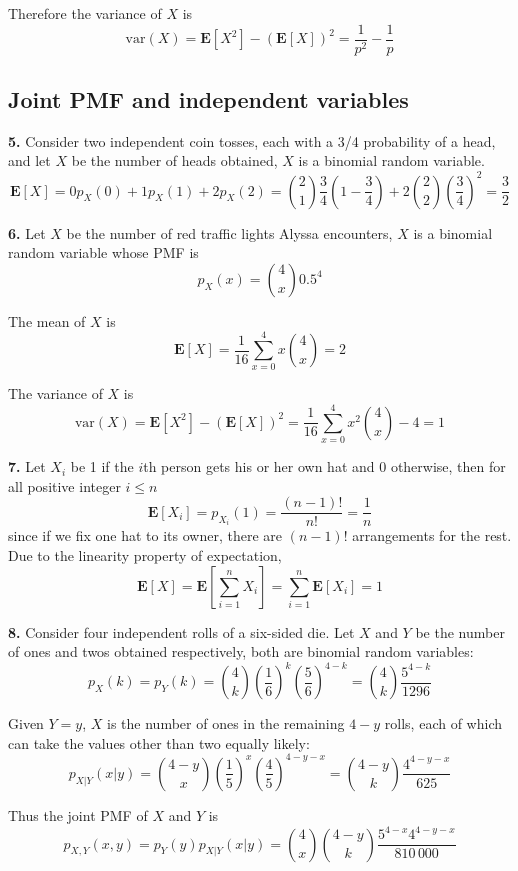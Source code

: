 \documentclass[a4paper,12pt]{article}
\newcommand{\E}{\mathbf E}
\newcommand{\var}{\mathrm{var}}
\newcommand{\exercise}[1]{\noindent\textbf{#1.}}
\begin{document}
Therefore the variance of $X$ is
\[\var(X) = \E\left[X^2\right] - (\E[X])^2 = \frac{1}{p^2} - \frac{1}{p}\]

\subsection{Joint PMF and independent variables}
\exercise 5  Consider two independent coin tosses,
each with a 3/4 probability of a head,
and let $X$ be the number of heads obtained,
$X$ is a binomial random variable.
\[\E[X] = 0p_X(0) + 1p_X(1) + 2p_X(2)
= \binom{2}{1}\frac{3}{4}\left(1 - \frac{3}{4}\right)
+ 2\binom{2}{2}\left(\frac{3}{4}\right)^2
= \frac{3}{2}\]

\exercise 6  Let $X$ be the number of red traffic lights Alyssa encounters,
$X$ is a binomial random variable whose PMF is
\[p_X(x) = \binom{4}{x}0.5^4\]

The mean of $X$ is
\[\E[X] = \frac{1}{16}\sum_{x=0}^4 x\binom{4}{x} = 2\]

The variance of $X$ is
\[\var(X) = \E\left[X^2\right] - (\E[X])^2
= \frac{1}{16}\sum_{x=0}^4 x^2\binom{4}{x} - 4 = 1\]

\exercise 7  Let $X_i$ be 1 if the $i$th person gets his or her own hat and 0
otherwise, then for all positive integer $i \le n$
\[\E[X_i] = p_{X_i}(1) = \frac{(n - 1)!}{n!} = \frac{1}{n}\]
since if we fix one hat to its owner, there are $(n - 1)!$ arrangements
for the rest.  Due to the linearity property of expectation,
\[\E[X] = \E\left[\sum_{i=1}^n X_i\right] = \sum_{i=1}^n\E[X_i] = 1\]

\exercise 8  Consider four independent rolls of a six-sided die.
Let $X$ and $Y$ be the number of ones and twos obtained respectively,
both are binomial random variables:
\[p_X(k) = p_Y(k)
= \binom{4}{k}\left(\frac{1}{6}\right)^k\left(\frac{5}{6}\right)^{4 - k}
= \binom{4}{k}\frac{5^{4 - k}}{1296}\]

Given $Y = y$, $X$ is the number of ones in the remaining $4 - y$ rolls,
each of which can take the values other than two equally likely:
\[p_{X|Y}(x|y)
= \binom{4 - y}{x}\left(\frac{1}{5}\right)^x\left(\frac{4}{5}\right)^{4 - y - x}
= \binom{4 - y}{k}\frac{4^{4 - y - x}}{625}\]

Thus the joint PMF of $X$ and $Y$ is
\[p_{X,Y}(x, y) = p_Y(y)p_{X|Y}(x|y)
= \binom{4}{x}\binom{4 - y}{k}\frac{5^{4 - x}4^{4 - y - x}}{810\,000}\]
\end{document}
